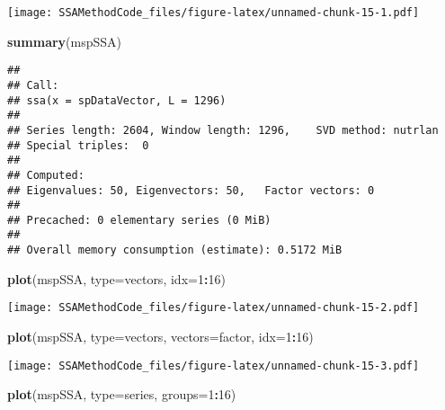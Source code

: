 \documentclass[
]{article}
\newenvironment{Shaded}{\begin{snugshade}}{\end{snugshade}}
\newcommand{\AttributeTok}[1]{\textcolor[rgb]{0.13,0.29,0.53}{#1}}
\newcommand{\DecValTok}[1]{\textcolor[rgb]{0.00,0.00,0.81}{#1}}
\newcommand{\FunctionTok}[1]{\textcolor[rgb]{0.13,0.29,0.53}{\textbf{#1}}}
\newcommand{\NormalTok}[1]{#1}
\newcommand{\SpecialCharTok}[1]{\textcolor[rgb]{0.81,0.36,0.00}{\textbf{#1}}}
\newcommand{\StringTok}[1]{\textcolor[rgb]{0.31,0.60,0.02}{#1}}
\begin{document}
\texttt{[image: SSAMethodCode\_files/figure-latex/unnamed-chunk-15-1.pdf]}

\begin{Shaded}
\begin{Highlighting}[]
\FunctionTok{summary}\NormalTok{(mspSSA)}
\end{Highlighting}
\end{Shaded}

\begin{verbatim}
## 
## Call:
## ssa(x = spDataVector, L = 1296)
## 
## Series length: 2604, Window length: 1296,    SVD method: nutrlan
## Special triples:  0
## 
## Computed:
## Eigenvalues: 50, Eigenvectors: 50,   Factor vectors: 0
## 
## Precached: 0 elementary series (0 MiB)
## 
## Overall memory consumption (estimate): 0.5172 MiB
\end{verbatim}

\begin{Shaded}
\begin{Highlighting}[]
\FunctionTok{plot}\NormalTok{(mspSSA, }\AttributeTok{type=}\StringTok{\textquotesingle{}vectors\textquotesingle{}}\NormalTok{, }\AttributeTok{idx=}\DecValTok{1}\SpecialCharTok{:}\DecValTok{16}\NormalTok{)}
\end{Highlighting}
\end{Shaded}

\texttt{[image: SSAMethodCode\_files/figure-latex/unnamed-chunk-15-2.pdf]}

\begin{Shaded}
\begin{Highlighting}[]
\FunctionTok{plot}\NormalTok{(mspSSA, }\AttributeTok{type=}\StringTok{\textquotesingle{}vectors\textquotesingle{}}\NormalTok{, }\AttributeTok{vectors=}\StringTok{\textquotesingle{}factor\textquotesingle{}}\NormalTok{, }\AttributeTok{idx=}\DecValTok{1}\SpecialCharTok{:}\DecValTok{16}\NormalTok{)}
\end{Highlighting}
\end{Shaded}

\texttt{[image: SSAMethodCode\_files/figure-latex/unnamed-chunk-15-3.pdf]}

\begin{Shaded}
\begin{Highlighting}[]
\FunctionTok{plot}\NormalTok{(mspSSA, }\AttributeTok{type=}\StringTok{\textquotesingle{}series\textquotesingle{}}\NormalTok{, }\AttributeTok{groups=}\DecValTok{1}\SpecialCharTok{:}\DecValTok{16}\NormalTok{)}
\end{Highlighting}
\end{Shaded}
\end{document}
